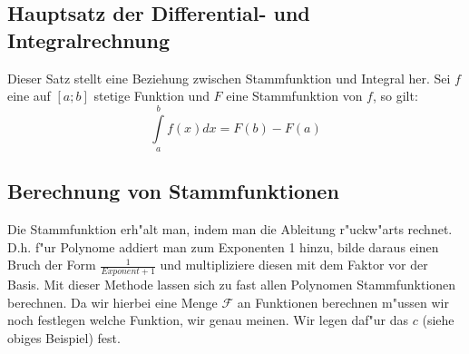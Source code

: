 \subsection{Hauptsatz der Differential- und Integralrechnung}
Dieser Satz stellt eine Beziehung zwischen Stammfunktion und Integral her. Sei $f$ eine auf $\left[a; b\right]$ stetige Funktion und $F$ eine Stammfunktion von $f$, so gilt:
\begin{equation*}
\int\limits_a^b f(x) dx = F(b) - F(a)
\end{equation*}
 


\subsection{Berechnung von Stammfunktionen}
Die Stammfunktion erh"alt man, indem man die Ableitung r"uckw"arts rechnet. D.h. f"ur Polynome addiert man zum Exponenten 1 hinzu, bilde daraus einen Bruch der Form $\frac{1}{Exponent+1}$ und multipliziere diesen mit dem Faktor vor der Basis. Mit dieser Methode lassen sich zu fast allen Polynomen Stammfunktionen berechnen. Da wir hierbei eine Menge $\mathcal{F}$ an Funktionen berechnen m"ussen wir noch festlegen welche Funktion, wir genau meinen. Wir legen daf"ur das $c$ (siehe obiges Beispiel) fest.

